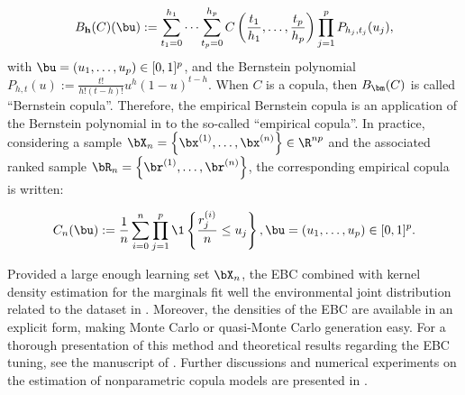 \begin{equation}
    B_{\mathbf{h}}(C)(\bu) := \sum_{t_1=0}^{h_1} \dots \sum_{t_p=0}^{h_p} C\left(\frac{t_1}{h_1}, \dots, \frac{t_p}{h_p}\right) \prod_{j=1}^p P_{h_j, t_j}(u_j),\label{eq:ebc_chap4}
\end{equation}
with $\bu = (u_1, \dots, u_p) \in [0, 1]^p$, and the Bernstein polynomial $P_{h, t}(u):= \frac{t!}{h!(t-h)!}u^h(1-u)^{t-h}$. When $C$ is a copula, then $B_{\bm}(C)$ is called ``Bernstein copula''. 
Therefore, the empirical Bernstein copula is an application of the Bernstein polynomial in  to the so-called ``empirical copula''. 
In practice, considering a sample $\bX_n = \left\{\bx^{(1)}, \dots, \bx^{(n)}\right\} \in \R^{np}$ and the associated ranked sample $\bR_n = \left\{\br^{(1)}, \dots, \br^{(n)}\right\}$, the corresponding empirical copula is written: 

\begin{equation}
    C_n(\bu) := \frac1n \sum_{i=0}^{n} \prod_{j=1}^{p} \1 \left\{ \frac{r_j^{(i)}}{n} \leq u_j \right\}, \bu = (u_1, \dots, u_p) \in [0, 1]^p.
\end{equation}

Provided a large enough learning set $\bX_n$, the EBC combined with kernel density estimation for the marginals fit well the environmental joint distribution related to the dataset in . 
Moreover, the densities of the EBC are available in an explicit form, making Monte Carlo or quasi-Monte Carlo generation easy. 
For a thorough presentation of this method and theoretical results regarding the EBC tuning, see the manuscript of \cite{lasserre_2022}. 
Further discussions and numerical experiments on the estimation of nonparametric copula models are presented in \cite{nagler_2017}. 


